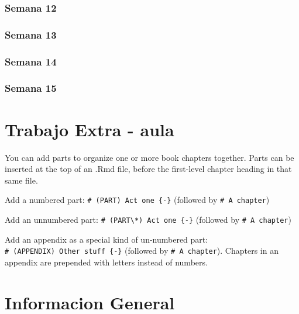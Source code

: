 \documentclass[
]{book}
\begin{document}
\hypertarget{semana-12}{%
\subsection*{Semana 12}\label{semana-12}}

\hypertarget{semana-13}{%
\subsection*{Semana 13}\label{semana-13}}

\hypertarget{semana-14}{%
\subsection*{Semana 14}\label{semana-14}}

\hypertarget{semana-15}{%
\subsection*{Semana 15}\label{semana-15}}

\hypertarget{trabajo-extra---aula}{%
\chapter{Trabajo Extra - aula}\label{trabajo-extra---aula}}

You can add parts to organize one or more book chapters together. Parts can be inserted at the top of an .Rmd file, before the first-level chapter heading in that same file.

Add a numbered part: \texttt{\#\ (PART)\ Act\ one\ \{-\}} (followed by \texttt{\#\ A\ chapter})

Add an unnumbered part: \texttt{\#\ (PART\textbackslash{}*)\ Act\ one\ \{-\}} (followed by \texttt{\#\ A\ chapter})

Add an appendix as a special kind of un-numbered part: \texttt{\#\ (APPENDIX)\ Other\ stuff\ \{-\}} (followed by \texttt{\#\ A\ chapter}). Chapters in an appendix are prepended with letters instead of numbers.

\hypertarget{informacion-general}{%
\chapter{Informacion General}\label{informacion-general}}
\end{document}
